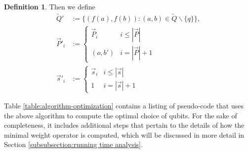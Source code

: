 \documentclass{amsbook}
\theoremstyle{plain}
\theoremstyle{definition}
\newtheorem{definition}{Definition}
\theoremstyle{remark}
\newcommand{\lst}{\vec}
\newcommand{\set}{\tilde}
\begin{document}
\begin{definition}
Then we define
$$
\begin{aligned}
\set Q'&:= \{(f(a),f(b)):(a,b)\in\set Q\backslash\{q\}\},\\
\lst P'_i&:=
\begin{cases}
\lst P_i & i \le |\lst P| \\
(o,b') & i = |\lst P|+1
\end{cases} \\
\lst s'_i&:=
\begin{cases}
\lst s_i & i \le |\lst s|\\
1 & i = |\lst s|+1
\end{cases}
\end{aligned}
$$
\end{definition}

Table \ref{table:algorithm-optimization} contains a listing of pseudo-code that uses the above algorithm to compute the optimal choice of qubits.  For the sake of completeness, it includes additional steps that pertain to the details of how the minimal weight operator is computed, which will be discussed in more detail in Section \ref{subsubsection:running time analysis}.
\end{document}

